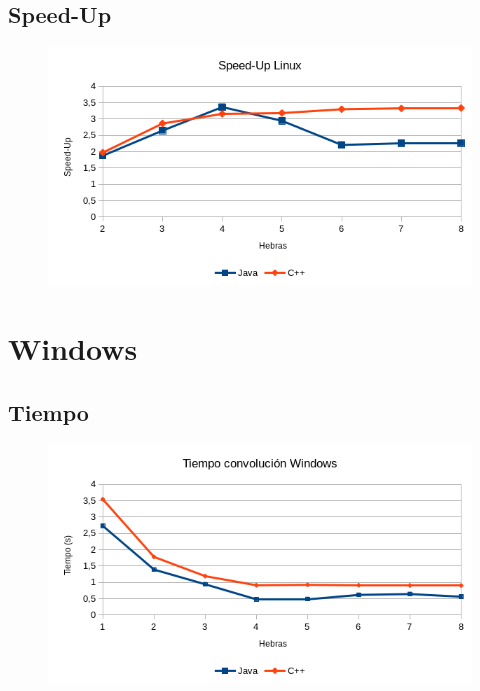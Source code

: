 \documentclass[12pt,letterpaper]{article}
\begin{document}
\subsection{Speed-Up}
\begin{figure}[h]
	\centering
	\includegraphics[scale=0.8]{SpeedUpLinux.png}
\end{figure}
\newpage

\section{Windows}
\subsection{Tiempo}
\begin{figure}[h]
	\centering
	\includegraphics[scale=0.8]{TiempoWindows.png}
\end{figure}
\end{document}
